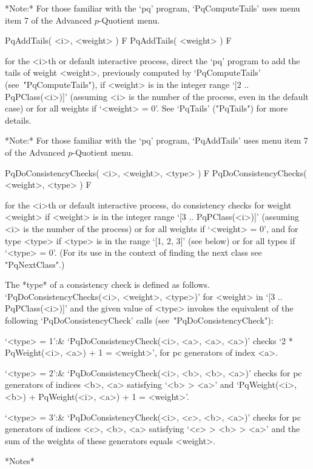 *Note:*
For those familiar with the `pq' program, `PqComputeTails' uses menu  item
7 of the Advanced $p$-Quotient menu.

\>PqAddTails( <i>, <weight> ) F
\>PqAddTails( <weight> ) F

for the <i>th or default interactive {\ANUPQ} process,  direct  the  `pq'
program to add the  tails  of  weight  <weight>,  previously  computed  by
`PqComputeTails' (see~"PqComputeTails"), if <weight> is  in  the  integer
range `[2 .. PqPClass(<i>)]' (assuming <i> is the number of the  process,
even in the default case) or for all  weights  if  `<weight>  =  0'.  See
`PqTails' ("PqTails") for more details.

*Note:*
For those familiar with the `pq' program, `PqAddTails' uses menu item 7 of
the Advanced $p$-Quotient menu.

\>PqDoConsistencyChecks( <i>, <weight>, <type> ) F
\>PqDoConsistencyChecks( <weight>, <type> ) F

for the <i>th or default interactive  {\ANUPQ}  process,  do  consistency
checks for weight <weight> if <weight> is in the  integer  range  `[3  ..
PqPClass(<i>)]' (assuming <i> is the number of the process)  or  for  all
weights if `<weight> = 0', and for type <type> if <type> is in the  range
`[1, 2, 3]' (see below) or for all types if `<type> = 0'. (For its use in
the context of finding the next class see "PqNextClass".)

The  *type*   of   a   consistency   check   is   defined   as   follows.
`PqDoConsistencyChecks(<i>, <weight>, <type>)' for  <weight>  in  `[3  ..
PqPClass(<i>)]' and the given value of <type> invokes the  equivalent  of
the following `PqDoConsistencyCheck' calls (see~"PqDoConsistencyCheck"):

\beginitems

`<type> = 1':&
`PqDoConsistencyCheck(<i>, <a>, <a>, <a>)' checks `2 * PqWeight(<i>, <a>)
+ 1 = <weight>', for pc generators of index <a>.

`<type> = 2':&
`PqDoConsistencyCheck(<i>, <b>, <b>, <a>)' checks for  pc  generators  of
indices <b>, <a>  satisfying  `<b>  >  <a>'  and  `PqWeight(<i>,  <b>)  +
PqWeight(<i>, <a>) + 1 = <weight>'.

`<type> = 3':&
`PqDoConsistencyCheck(<i>, <c>, <b>, <a>)' checks for  pc  generators  of
indices <c>, <b>, <a> satisfying `<c> > <b> > <a>' and  the  sum  of  the
weights of these generators equals <weight>.

\enditems

*Notes*

